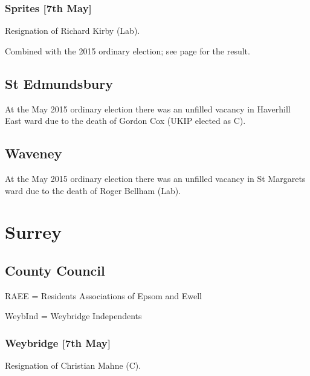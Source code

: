\documentclass[a4paper,openany]{book}
\begin{document}
\begin{resultsiii}
\subsubsection*{Sprites \hspace*{\fill}\nolinebreak[1]%
\enspace\hspace*{\fill}
[7th May]}


Resignation of Richard Kirby (Lab).

Combined with the 2015 ordinary election; see page \pageref{SpritesIpswich} for the result.

\subsection*{St Edmundsbury}

At the May 2015 ordinary election there was an unfilled vacancy in Haverhill East ward due to the death of Gordon Cox (UKIP elected as C).

\subsection*{Waveney}

At the May 2015 ordinary election there was an unfilled vacancy in St Margarets ward due to the death of Roger Bellham (Lab).

\section{Surrey}

\subsection*{County Council}

RAEE = Residents Associations of Epsom and Ewell

WeybInd = Weybridge Independents

\subsubsection*{Weybridge \hspace*{\fill}\nolinebreak[1]%
\enspace\hspace*{\fill}
[7th May]}


Resignation of Christian Mahne (C).


\end{resultsiii}
\end{document}
